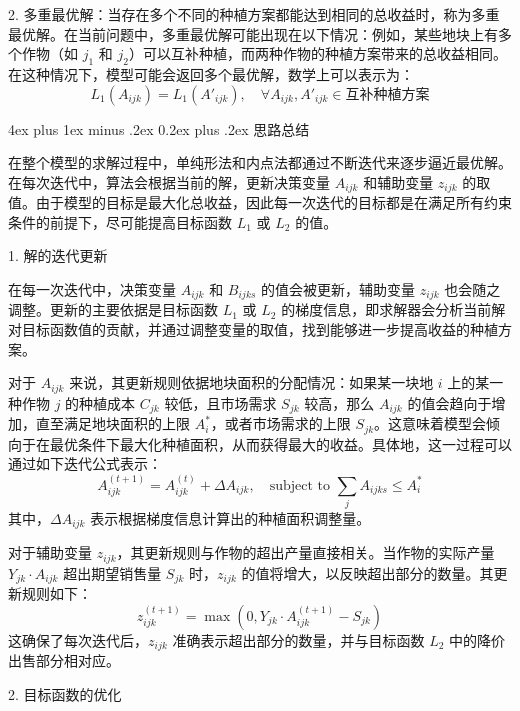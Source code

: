 \documentclass[12pt,a4paper]{nmmcm}
\makeatletter
\renewcommand\subsubsection{\@startsection{subsubsection}{3}{1em}%
  {4ex plus 1ex minus .2ex}%
  {0.2ex plus .2ex}%
  {\normalfont\large\bfseries}}
\makeatother
\begin{document}
2. 多重最优解：当存在多个不同的种植方案都能达到相同的总收益时，称为多重最优解。在当前问题中，多重最优解可能出现在以下情况：例如，某些地块上有多个作物（如 $j_1$ 和 $j_2$）可以互补种植，而两种作物的种植方案带来的总收益相同。在这种情况下，模型可能会返回多个最优解，数学上可以表示为：
   \[
   L_1(A_{ijk}) = L_1(A'_{ijk}), \quad \forall A_{ijk}, A'_{ijk} \in \text{互补种植方案}
   \]


\subsubsection{思路总结}

在整个模型的求解过程中，单纯形法和内点法都通过不断迭代来逐步逼近最优解。在每次迭代中，算法会根据当前的解，更新决策变量 $A_{ijk}$ 和辅助变量 $z_{ijk}$ 的取值。由于模型的目标是最大化总收益，因此每一次迭代的目标都是在满足所有约束条件的前提下，尽可能提高目标函数 $L_1$ 或 $L_2$ 的值。

 1. 解的迭代更新

在每一次迭代中，决策变量 $A_{ijk}$ 和 $B_{ijks}$ 的值会被更新，辅助变量 $z_{ijk}$ 也会随之调整。更新的主要依据是目标函数 $L_1$ 或 $L_2$ 的梯度信息，即求解器会分析当前解对目标函数值的贡献，并通过调整变量的取值，找到能够进一步提高收益的种植方案。

对于 $A_{ijk}$ 来说，其更新规则依据地块面积的分配情况：如果某一块地 $i$ 上的某一种作物 $j$ 的种植成本 $C_{jk}$ 较低，且市场需求 $S_{jk}$ 较高，那么 $A_{ijk}$ 的值会趋向于增加，直至满足地块面积的上限 $A_i^*$，或者市场需求的上限 $S_{jk}$。这意味着模型会倾向于在最优条件下最大化种植面积，从而获得最大的收益。具体地，这一过程可以通过如下迭代公式表示：
\[
A_{ijk}^{(t+1)} = A_{ijk}^{(t)} + \Delta A_{ijk}, \quad \text{subject to } \sum_j A_{ijks} \leq A_i^*
\]
其中，$\Delta A_{ijk}$ 表示根据梯度信息计算出的种植面积调整量。

对于辅助变量 $z_{ijk}$，其更新规则与作物的超出产量直接相关。当作物的实际产量 $Y_{jk} \cdot A_{ijk}$ 超出期望销售量 $S_{jk}$ 时，$z_{ijk}$ 的值将增大，以反映超出部分的数量。其更新规则如下：
\[
z_{ijk}^{(t+1)} = \max(0, Y_{jk} \cdot A_{ijk}^{(t+1)} - S_{jk})
\]
这确保了每次迭代后，$z_{ijk}$ 准确表示超出部分的数量，并与目标函数 $L_2$ 中的降价出售部分相对应。

2. 目标函数的优化
\end{document}
